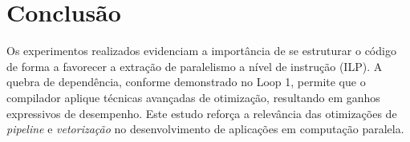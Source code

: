 \documentclass[a4paper, 12pt]{article}
\begin{document}
	\section{Conclusão}
	Os experimentos realizados evidenciam a importância de se estruturar o código de forma a favorecer a extração de paralelismo a nível de instrução (ILP). A quebra de dependência, conforme demonstrado no Loop 1, permite que o compilador aplique técnicas avançadas de otimização, resultando em ganhos expressivos de desempenho. Este estudo reforça a relevância das otimizações de \emph{pipeline} e \emph{vetorização} no desenvolvimento de aplicações em computação paralela.
	
	
	
	
	
\end{document}

